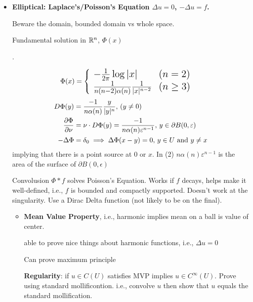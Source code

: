 \documentclass[12pt,a4paper]{report}
\begin{document}
{\begin{description}
\begin{itemize}
		\item \textbf{Elliptical: Laplace's/Poisson's Equation $\Delta u=0$, $-\Delta u=f$.}
		
		Beware the domain, bounded domain vs whole space.
		
		Fundamental solution in $\mathbb{R}^n$, $\Phi(x)$
		
\begin{remark}.

\begin{align*}
	\Phi(x) &= \Large\left \{ \begin{array}{ll} -\frac{1}{2\pi}\log |x| & (n=2)\\ \frac{1}{n(n-2)\alpha(n)}\frac{1}{|x|^{n-2}} & (n\ge 3) \end{array} \right . 
\end{align*}
\begin{align}
	D\Phi(y) &= \frac{-1}{n\alpha(n)}\frac{y}{|y|^n},\, (y\ne 0)\\
	\frac{\partial \Phi}{\partial \nu} &= \nu\cdot D\Phi(y)= \frac{-1}{n\alpha(n)\varepsilon^{n-1}},\, y \in \partial B(0,\varepsilon)  \\
	-\Delta\Phi &= \delta_0 \implies \Delta\Phi(x-y)=0,\, y \in U \text{ and } y \ne x
\end{align}implying that there is a point source at 0 or $x$. In (2) $n\alpha(n)\varepsilon^{n-1}$ is the area of the surface of $\partial B(0,\epsilon)$

\end{remark}
		Convolusion $\Phi * f$ solves Poisson's Equation.  Works if $f$ decays, helps make it well-defined, i.e., $f$ is bounded and compactly supported.  Doesn't work at the singularity. Use a Dirac Delta function (not likely to be on the final).
		\begin{itemize}
			\item \textbf{Mean Value Property}, i.e., harmonic implies mean on a ball is value of center.
			
			able to prove nice things about harmonic functions, i.e., $\Delta u=0$
			
			Can prove maximum principle
			
			\textbf{Regularity}: if $u \in C(U)$ satisfies MVP implies $u \in C^\infty(U)$.  Prove using standard mollificontion.  i.e., convolve $u$ then show that $u$ equals the standard mollification. 
			
			

\end{itemize}
\end{itemize}
\end{description}}
\end{document}
